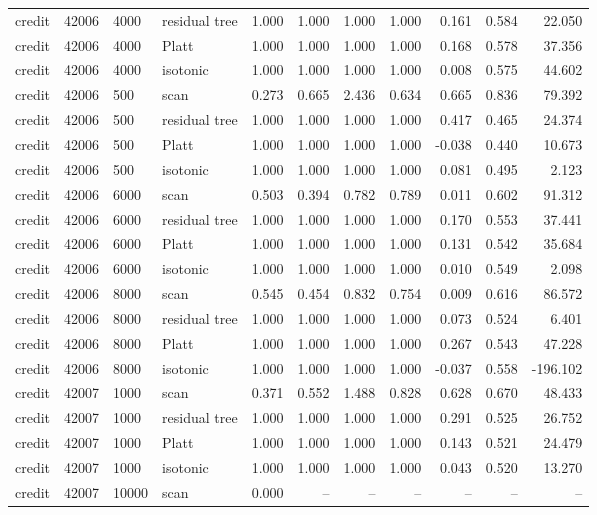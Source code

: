 \begin{tabular}{lrllrrrrrrr}
credit & 42006 & 4000 & residual tree & 1.000 & 1.000 & 1.000 & 1.000 & 0.161 & 0.584 & 22.050 \\
credit & 42006 & 4000 & Platt & 1.000 & 1.000 & 1.000 & 1.000 & 0.168 & 0.578 & 37.356 \\
credit & 42006 & 4000 & isotonic & 1.000 & 1.000 & 1.000 & 1.000 & 0.008 & 0.575 & 44.602 \\
credit & 42006 & 500 & scan & 0.273 & 0.665 & 2.436 & 0.634 & 0.665 & 0.836 & 79.392 \\
credit & 42006 & 500 & residual tree & 1.000 & 1.000 & 1.000 & 1.000 & 0.417 & 0.465 & 24.374 \\
credit & 42006 & 500 & Platt & 1.000 & 1.000 & 1.000 & 1.000 & -0.038 & 0.440 & 10.673 \\
credit & 42006 & 500 & isotonic & 1.000 & 1.000 & 1.000 & 1.000 & 0.081 & 0.495 & 2.123 \\
credit & 42006 & 6000 & scan & 0.503 & 0.394 & 0.782 & 0.789 & 0.011 & 0.602 & 91.312 \\
credit & 42006 & 6000 & residual tree & 1.000 & 1.000 & 1.000 & 1.000 & 0.170 & 0.553 & 37.441 \\
credit & 42006 & 6000 & Platt & 1.000 & 1.000 & 1.000 & 1.000 & 0.131 & 0.542 & 35.684 \\
credit & 42006 & 6000 & isotonic & 1.000 & 1.000 & 1.000 & 1.000 & 0.010 & 0.549 & 2.098 \\
credit & 42006 & 8000 & scan & 0.545 & 0.454 & 0.832 & 0.754 & 0.009 & 0.616 & 86.572 \\
credit & 42006 & 8000 & residual tree & 1.000 & 1.000 & 1.000 & 1.000 & 0.073 & 0.524 & 6.401 \\
credit & 42006 & 8000 & Platt & 1.000 & 1.000 & 1.000 & 1.000 & 0.267 & 0.543 & 47.228 \\
credit & 42006 & 8000 & isotonic & 1.000 & 1.000 & 1.000 & 1.000 & -0.037 & 0.558 & -196.102 \\
credit & 42007 & 1000 & scan & 0.371 & 0.552 & 1.488 & 0.828 & 0.628 & 0.670 & 48.433 \\
credit & 42007 & 1000 & residual tree & 1.000 & 1.000 & 1.000 & 1.000 & 0.291 & 0.525 & 26.752 \\
credit & 42007 & 1000 & Platt & 1.000 & 1.000 & 1.000 & 1.000 & 0.143 & 0.521 & 24.479 \\
credit & 42007 & 1000 & isotonic & 1.000 & 1.000 & 1.000 & 1.000 & 0.043 & 0.520 & 13.270 \\
credit & 42007 & 10000 & scan & 0.000 & -- & -- & -- & -- & -- & -- \\

\end{tabular}
